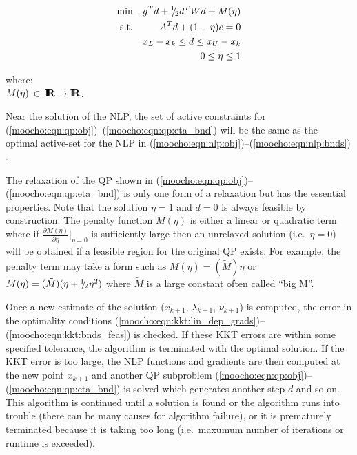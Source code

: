 \documentclass[pdf,ps2pdf,11pt]{SANDreport}
\begin{document}
{{\bsinglespace
\begin{eqnarray}
\mbox{min}  &  & g^T d + {}^1 \!\! / \! {}_2 d^T W d + M(\eta)                   \label{moocho:eqn:qp:obj} \\
\mbox{s.t.} &  & A^T d + (1-\eta) c = 0                                 \label{moocho:eqn:qp:equ} \\
            &  & x_L - x_k \leq d \leq x_U -x_k                         \label{moocho:eqn:qp:bnds} \\
            &  & 0 \leq \eta \leq 1                                     \label{moocho:eqn:qp:eta_bnd}
\end{eqnarray}
\begin{tabbing}
\hspace{4ex}where:\hspace{5ex}\= \\
\>	$M(\eta) \:\in\:\mbox{\textbf{I}}\hspace{-0.6ex}\mbox{\textbf{R}} \rightarrow \mbox{\textbf{I}}\hspace{-0.6ex}\mbox{\textbf{R}}$.
\end{tabbing}
\esinglespace}

Near the solution of the NLP,
the set of active constraints for
(\ref{moocho:eqn:qp:obj})--(\ref{moocho:eqn:qp:eta_bnd}) will be the same
as the optimal active-set for the NLP in
(\ref{moocho:eqn:nlp:obj})--(\ref{moocho:eqn:nlp:bnds})
\cite[Theorem 18.1]{ref:nocedal_wright_1999}.

The relaxation of the QP shown in
(\ref{moocho:eqn:qp:obj})--(\ref{moocho:eqn:qp:eta_bnd}) is only one
form of a relaxation but has the essential properties.  Note that the
solution $\eta = 1$ and $d = 0$ is always feasible by construction.
The penalty function $M(\eta)$ is either a linear or quadratic term
where if $\frac{\partial M(\eta)}{\partial \eta}|_{\eta = 0}$ is
sufficiently large then an unrelaxed solution (i.e.~$\eta = 0$) will
be obtained if a feasible region for the original QP exists.  For
example, the penalty term may take a form such as $M(\eta) =
(\tilde{M}) \eta$ or $M(\eta) = (\tilde{M})(\eta + {}^1 \!\! / \! {}_2 \eta^2)$
where $\tilde{M}$ is a large constant often called ``big M''.

Once a new estimate of the solution ($x_{k+1}$, $\lambda_{k+1}$,
$\nu_{k+1}$) is computed, the error in the optimality conditions
(\ref{moocho:eqn:kkt:lin_dep_grads})--(\ref{moocho:eqn:kkt:bnds_feas})
is checked.  If these KKT errors are within some specified tolerance,
the algorithm is terminated with the optimal solution.  If the KKT
error is too large, the NLP functions and gradients are then computed
at the new point $x_{k+1}$ and another QP subproblem
(\ref{moocho:eqn:qp:obj})--(\ref{moocho:eqn:qp:eta_bnd}) is solved
which generates another step $d$ and so on.  This algorithm is
continued until a solution is found or the algorithm runs into trouble
(there can be many causes for algorithm failure), or it is prematurely
terminated because it is taking too long (i.e.~maxumum number of
iterations or runtime is exceeded).

}
\end{document}
